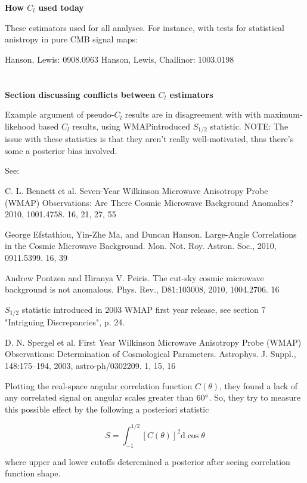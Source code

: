 \documentclass[a4paper, 11pt]{article}
\begin{document}
\textbf{How $C_l$ used today}

These estimators used for all analyses. For instance, with tests for statistical anistropy in pure CMB signal maps:

Hanson, Lewis: 0908.0963
Hanson, Lewis,  Challinor: 1003.0198

\paragraph{} \hspace{0pt} \\


\textbf{Section discussing conflicts between $C_l$ estimators}

Example argument of pseudo-$C_l$ results are in disagreement with with maximum-likehood based $C_l$ results, using WMAPintroduced $S_{1/2}$ statistic. NOTE: The issue with these statistics is that they aren't really well-motivated, thus there's some a posterior bias involved.

See: 

C. L. Bennett et al. Seven-Year Wilkinson Microwave Anisotropy Probe (WMAP) Observations: Are There Cosmic Microwave Background Anomalies? 2010, 1001.4758. 16, 21, 27, 55

George Efstathiou, Yin-Zhe Ma, and Duncan Hanson. Large-Angle Correlations in the Cosmic Microwave Background. Mon. Not. Roy. Astron. Soc., 2010, 0911.5399. 16, 39

Andrew Pontzen and Hiranya V. Peiris. The cut-sky cosmic microwave background is not anomalous. Phys. Rev., D81:103008, 2010, 1004.2706. 16



$S_{1/2}$ statistic introduced in 2003 WMAP first year release, see section 7 "Intriguing Discrepancies", p. 24.  

D. N. Spergel et al. First Year Wilkinson Microwave Anisotropy Probe (WMAP) Observations: Determination of Cosmological Parameters. Astrophys. J. Suppl., 148:175–194, 2003, astro-ph/0302209. 1, 15, 16


Plotting the real-space angular correlation function $C(\theta)$, they found a lack of any correlated signal on angular scales greater than $60\degree$. So, they try to measure this possible effect by the following a posteriori statistic

$$
S=\int^{1/2}_{-1}[C(\theta)]^2\text{d}\cos\theta
$$

where upper and lower cutoffs deteremined a posterior after seeing correlation function shape.
\end{document}
